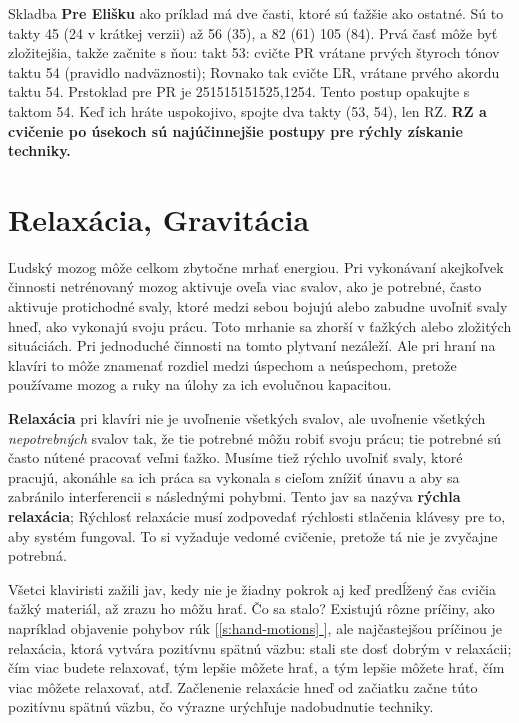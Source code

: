 \documentclass[11pt,a4paper]{book}
\newcommand*{\fullref}[1]{\hyperref[{#1}]{\ref*{#1} \nameref*{#1}}} %
\newcommand*{\fullrefp}[1]{[\fullref{#1}]} %
\begin{document}
Skladba \textbf{Pre Elišku} ako príklad má dve časti, ktoré sú ťažšie ako ostatné. Sú to takty 45 (24 v krátkej verzii) až 56 (35), a 82 (61) 105 (84). Prvá časť môže byť zložitejšia, takže začnite s ňou:   takt 53: cvičte PR vrátane prvých štyroch tónov taktu 54 (pravidlo nadväznosti); Rovnako tak cvičte ĽR, vrátane prvého akordu taktu 54. Prstoklad pre PR je 251515151525,1254. Tento postup opakujte s  taktom 54. Keď ich hráte uspokojivo, spojte dva takty (53, 54), len RZ. \textbf{RZ a cvičenie po úsekoch sú najúčinnejšie postupy pre rýchly získanie techniky.}

\section{Relaxácia, Gravitácia}\label{s:relaxation}
Ľudský mozog môže celkom zbytočne mrhať energiou. Pri vykonávaní akejkoľvek činnosti netrénovaný mozog aktivuje oveľa viac svalov, ako je potrebné, často aktivuje protichodné svaly, ktoré medzi sebou bojujú alebo zabudne uvoľniť svaly hneď, ako vykonajú svoju prácu. Toto mrhanie sa zhorší v ťažkých alebo zložitých situáciách. Pri jednoduché činnosti na tomto plytvaní nezáleží. Ale pri hraní na klavíri to môže znamenať rozdiel medzi úspechom a neúspechom, pretože používame mozog a ruky na úlohy za ich evolučnou kapacitou.

\textbf{Relaxácia} pri klavíri nie je uvoľnenie všetkých svalov, ale uvoľnenie všetkých \emph{nepotrebných} svalov tak, že tie potrebné môžu robiť svoju prácu; tie potrebné sú často nútené pracovať veľmi ťažko. Musíme tiež rýchlo uvoľniť svaly, ktoré  pracujú, akonáhle sa ich práca sa vykonala s cieľom znížiť únavu a aby sa zabránilo interferencii s následnými pohybmi. Tento jav sa nazýva \textbf{rýchla relaxácia}; Rýchlosť relaxácie musí zodpovedať rýchlosti stlačenia klávesy pre to, aby systém fungoval. To si vyžaduje vedomé cvičenie, pretože tá nie je zvyčajne potrebná.

Všetci klaviristi zažili jav, kedy nie je žiadny pokrok aj keď predĺžený čas cvičia ťažký materiál, až zrazu ho môžu hrať. Čo sa stalo? Existujú rôzne príčiny, ako napríklad objavenie pohybov rúk \fullrefp{s:hand-motions}, ale najčastejšou príčinou je relaxácia, ktorá vytvára pozitívnu spätnú väzbu: stali ste dosť dobrým v relaxácii; čím viac budete relaxovať, tým lepšie môžete hrať, a tým lepšie môžete hrať, čím viac môžete relaxovať, atď. Začlenenie relaxácie hneď od začiatku začne túto pozitívnu spätnú väzbu, čo výrazne urýchľuje nadobudnutie techniky.
\end{document}
